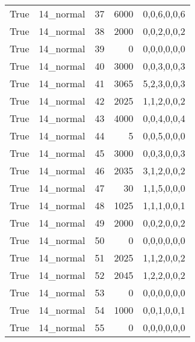 \begin{tabular}{llrrl}
 True            & 14\_normal           &            37 &                  6000 & 0,0,6,0,0,6   \\
 True            & 14\_normal           &            38 &                  2000 & 0,0,2,0,0,2   \\
 True            & 14\_normal           &            39 &                     0 & 0,0,0,0,0,0   \\
 True            & 14\_normal           &            40 &                  3000 & 0,0,3,0,0,3   \\
 True            & 14\_normal           &            41 &                  3065 & 5,2,3,0,0,3   \\
 True            & 14\_normal           &            42 &                  2025 & 1,1,2,0,0,2   \\
 True            & 14\_normal           &            43 &                  4000 & 0,0,4,0,0,4   \\
 True            & 14\_normal           &            44 &                     5 & 0,0,5,0,0,0   \\
 True            & 14\_normal           &            45 &                  3000 & 0,0,3,0,0,3   \\
 True            & 14\_normal           &            46 &                  2035 & 3,1,2,0,0,2   \\
 True            & 14\_normal           &            47 &                    30 & 1,1,5,0,0,0   \\
 True            & 14\_normal           &            48 &                  1025 & 1,1,1,0,0,1   \\
 True            & 14\_normal           &            49 &                  2000 & 0,0,2,0,0,2   \\
 True            & 14\_normal           &            50 &                     0 & 0,0,0,0,0,0   \\
 True            & 14\_normal           &            51 &                  2025 & 1,1,2,0,0,2   \\
 True            & 14\_normal           &            52 &                  2045 & 1,2,2,0,0,2   \\
 True            & 14\_normal           &            53 &                     0 & 0,0,0,0,0,0   \\
 True            & 14\_normal           &            54 &                  1000 & 0,0,1,0,0,1   \\
 True            & 14\_normal           &            55 &                     0 & 0,0,0,0,0,0   \\

\end{tabular}
